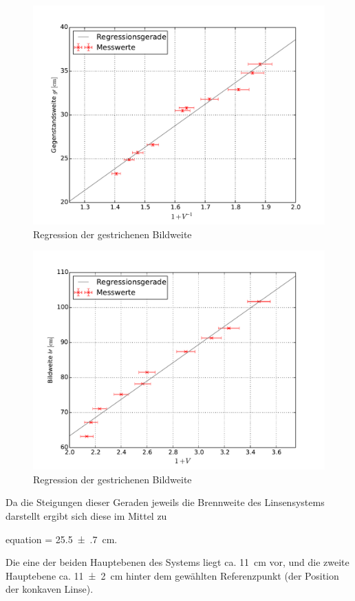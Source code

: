 	\begin{figure}[!h]
		\centering
		\includegraphics[scale=.7]{Grafiken/Messwerte_Abbe2.pdf}
		\caption{Regression der gestrichenen Bildweite\label{fig:Auswertung_AbbeG}}
	\end{figure}
	
	\begin{figure}[!h]
		\centering
		\includegraphics[scale=.7]{Grafiken/Messwerte_Abbe1.pdf}
		\caption{Regression der gestrichenen Bildweite\label{fig:Auswertung_AbbeB}}
	\end{figure}
	
	
	
	
	Da die Steigungen dieser Geraden jeweils die Brennweite des Linsensystems darstellt ergibt sich
	diese im Mittel zu
 	\begin{empheq}{equation}
 		\label{val:Auswertung_Abbe}
 		 = \SI{25.5(7)}{\centi\meter}.
 	\end{empheq}
 	
 	Die eine der beiden Hauptebenen des Systems liegt ca. \SI{11}{\centi\meter} vor,
 	und die zweite Hauptebene ca. \SI{11(2)}{\centi\meter} hinter dem gewählten 
 	Referenzpunkt (der Position der konkaven Linse).  
 	